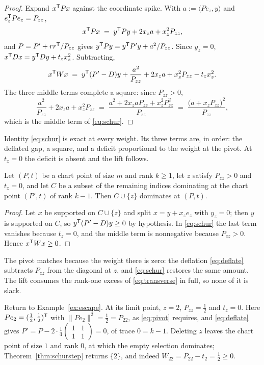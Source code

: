 \begin{proof}
Expand $x^{\mathsf{T}} Px$ against the coordinate spike.  With
$a:=\langle Pe_z,y\rangle$ and $e_z^{\mathsf{T}} Pe_z=P_{zz}$,
\[
  x^{\mathsf{T}} Px\;=\;y^{\mathsf{T}} Py+2x_za+x_z^{2}P_{zz},
\]
and $P=P'+rr^{\mathsf{T}}/P_{zz}$ gives
$y^{\mathsf{T}} Py=y^{\mathsf{T}} P'y+a^{2}/P_{zz}$.  Since $y_z=0$,
$x^{\mathsf{T}} Dx=y^{\mathsf{T}} Dy+t_zx_z^{2}$.  Subtracting,
\[
  x^{\mathsf{T}} Wx\;=\;y^{\mathsf{T}}(P'-D)y
    +\frac{a^{2}}{P_{zz}}+2x_za+x_z^{2}P_{zz}-t_zx_z^{2} .
\]
The three middle terms complete a square: since $P_{zz}>0$,
\[
  \frac{a^{2}}{P_{zz}}+2x_za+x_z^{2}P_{zz}
  \;=\;\frac{a^{2}+2x_zaP_{zz}+x_z^{2}P_{zz}^{2}}{P_{zz}}
  \;=\;\frac{\bigl(a+x_zP_{zz}\bigr)^{2}}{P_{zz}} ,
\]
which is the middle term of \eqref{eq:schur}.
\end{proof}

Identity \eqref{eq:schur} is exact at every weight.  Its three terms are,
in order: the deflated gap, a square, and a deficit proportional to the
weight at the pivot.  At $t_z=0$ the deficit is absent and the lift
follows.

\begin{theorem}[Lean]\label{thm:schurstep}
Let $(P,t)$ be a chart point of size $m$ and rank $k\ge1$, let $z$
satisfy $P_{zz}>0$ and $t_z=0$, and let $C$ be a subset of the remaining
indices dominating at the chart point $(P',t)$ of rank $k-1$.  Then
$C\cup\{z\}$ dominates at $(P,t)$.
\end{theorem}

\begin{proof}
Let $x$ be supported on $C\cup\{z\}$ and split $x=y+x_ze_z$ with $y_z=0$;
then $y$ is supported on $C$, so $y^{\mathsf{T}}(P'-D)y\ge0$ by hypothesis.  In
\eqref{eq:schur} the last term vanishes because $t_z=0$, and the middle
term is nonnegative because $P_{zz}>0$.  Hence $x^{\mathsf{T}} Wx\ge0$.
\end{proof}

The pivot matches because the weight there is zero: the deflation
\eqref{eq:deflate} subtracts $P_{zz}$ from the diagonal at $z$, and
\eqref{eq:schur} restores the same amount.  The lift consumes the
rank-one excess of \eqref{eq:transverse} in full, so none of it is slack.

\begin{example}
Return to Example~\ref{ex:escape}.  At its limit point, $z=2$,
$P_{zz}=\tfrac12$
and $t_z=0$.  Here $Pe_2=(\tfrac12,\tfrac12)^{\mathsf{T}}$ with
$\lVert Pe_2\rVert^{2}=\tfrac12=P_{22}$, as \eqref{eq:pivot} requires,
and \eqref{eq:deflate} gives $P'=P-2\cdot\tfrac14
\left(\begin{smallmatrix}1&1\\1&1\end{smallmatrix}\right)=0$, of trace
$0=k-1$.  Deleting $z$ leaves the chart point of size $1$ and rank $0$,
at which the empty selection dominates; Theorem~\ref{thm:schurstep}
returns $\{2\}$, and indeed $W_{22}=P_{22}-t_2=\tfrac12\ge0$.
\end{example}

